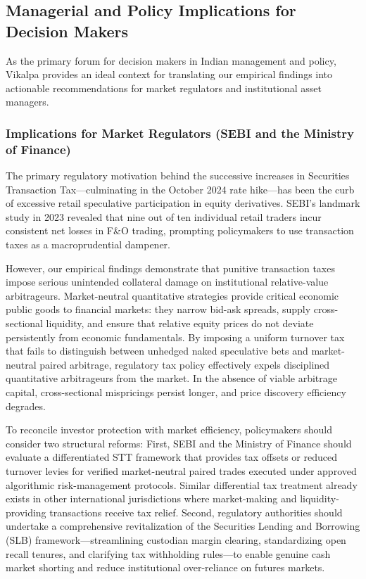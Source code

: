 \subsection{Managerial and Policy Implications for Decision Makers}
As the primary forum for decision makers in Indian management and policy, Vikalpa provides an ideal context for translating our empirical findings into actionable recommendations for market regulators and institutional asset managers.


\subsubsection*{Implications for Market Regulators (SEBI and the Ministry of Finance)}
The primary regulatory motivation behind the successive increases in Securities Transaction Tax—culminating in the October 2024 rate hike—has been the curb of excessive retail speculative participation in equity derivatives. SEBI's landmark study in 2023 revealed that nine out of ten individual retail traders incur consistent net losses in F\&O trading, prompting policymakers to use transaction taxes as a macroprudential dampener.

However, our empirical findings demonstrate that punitive transaction taxes impose serious unintended collateral damage on institutional relative-value arbitrageurs. Market-neutral quantitative strategies provide critical economic public goods to financial markets: they narrow bid-ask spreads, supply cross-sectional liquidity, and ensure that relative equity prices do not deviate persistently from economic fundamentals. By imposing a uniform turnover tax that fails to distinguish between unhedged naked speculative bets and market-neutral paired arbitrage, regulatory tax policy effectively expels disciplined quantitative arbitrageurs from the market. In the absence of viable arbitrage capital, cross-sectional mispricings persist longer, and price discovery efficiency degrades.

To reconcile investor protection with market efficiency, policymakers should consider two structural reforms: First, SEBI and the Ministry of Finance should evaluate a differentiated STT framework that provides tax offsets or reduced turnover levies for verified market-neutral paired trades executed under approved algorithmic risk-management protocols. Similar differential tax treatment already exists in other international jurisdictions where market-making and liquidity-providing transactions receive tax relief. Second, regulatory authorities should undertake a comprehensive revitalization of the Securities Lending and Borrowing (SLB) framework—streamlining custodian margin clearing, standardizing open recall tenures, and clarifying tax withholding rules—to enable genuine cash market shorting and reduce institutional over-reliance on futures markets.


